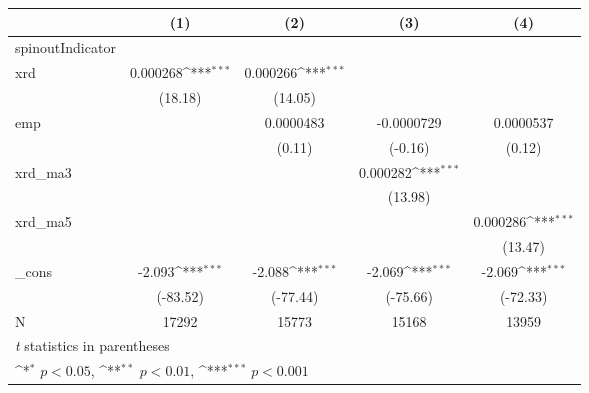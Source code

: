 {
\def\sym#1{\ifmmode^{#1}\else\(^{#1}\)\fi}
\begin{tabular}{l*{4}{c}}
\hline\hline
            &\multicolumn{1}{c}{(1)}         &\multicolumn{1}{c}{(2)}         &\multicolumn{1}{c}{(3)}         &\multicolumn{1}{c}{(4)}         \\
\hline
spinoutIndicator&                     &                     &                     &                     \\
xrd         &    0.000268\sym{***}&    0.000266\sym{***}&                     &                     \\
            &     (18.18)         &     (14.05)         &                     &                     \\
[1em]
emp         &                     &   0.0000483         &  -0.0000729         &   0.0000537         \\
            &                     &      (0.11)         &     (-0.16)         &      (0.12)         \\
[1em]
xrd\_ma3     &                     &                     &    0.000282\sym{***}&                     \\
            &                     &                     &     (13.98)         &                     \\
[1em]
xrd\_ma5     &                     &                     &                     &    0.000286\sym{***}\\
            &                     &                     &                     &     (13.47)         \\
[1em]
\_cons      &      -2.093\sym{***}&      -2.088\sym{***}&      -2.069\sym{***}&      -2.069\sym{***}\\
            &    (-83.52)         &    (-77.44)         &    (-75.66)         &    (-72.33)         \\
\hline
N           &       17292         &       15773         &       15168         &       13959         \\
\hline\hline
\multicolumn{5}{l}{\footnotesize \textit{t} statistics in parentheses}\\
\multicolumn{5}{l}{\footnotesize \sym{*} \(p<0.05\), \sym{**} \(p<0.01\), \sym{***} \(p<0.001\)}\\
\end{tabular}
}
